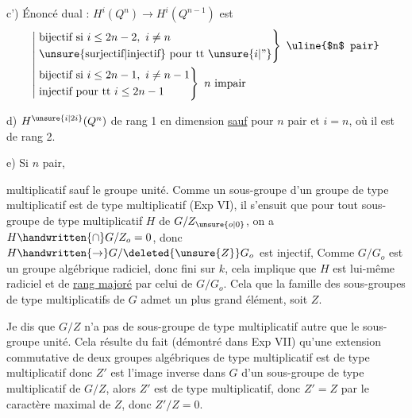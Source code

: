 c') Énoncé dual : $H^i(Q^n)\longrightarrow H^i(Q^{n-1})$ est
\[
\left|\begin{aligned}
&\left.\begin{aligned}
&\text{bijectif si }i\leq 2n-2,\ i\ne n\\
&\text{\unsure{surjectif|injectif} pour tt } \unsure{i|\text{''}}
\end{aligned}\right\}\ \text{\uline{$n$ pair}}\\
&\left.\begin{aligned}
&\text{bijectif si }i\leq2n-1,\ i\ne n-1\\
&\text{injectif pour tt }i\leq2n-1
\end{aligned}\right\}\ n\text{ impair}
\end{aligned}\right.
\]

d) $H^{\unsure{i|2i}}(Q^n)$   de rang 1 en  dimension  \uline{sauf} pour $n$ pair et  $i=n$, où il est de rang 2.

e) Si $n$ pair,

multiplicatif  sauf le groupe unité. Comme un sous-groupe d'un \margin{$\bullet$} groupe de type multiplicatif est de type multiplicatif (Exp VI\quad ), il s'ensuit que  pour tout sous-groupe de type multiplicatif $H$ de $G/Z_{\unsure{o|0}}$, on a $H\handwritten{\cap}G/Z_o=0$, donc $H\handwritten{\to}G/\deleted{\unsure{Z}}G_o$ est injectif, Comme $G/G_o$ est un groupe algébrique radiciel, donc fini sur $k$, cela implique que $H$ est lui-même radiciel et de \uline{rang majoré} par celui de $G/G_o$. Cela  que la famille des sous-groupes de type multiplicatifs de $G$ admet un plus grand élément, soit $Z$.

Je dis que $G/Z$ n'a pas de sous-groupe de type multiplicatif autre que le sous-groupe unité. Cela résulte du fait (démontré dans \margin{$\bullet$} Exp VII\quad ) qu'une extension commutative de deux groupes algébriques de type multiplicatif est de type multiplicatif\handwritten{;}   donc $Z'$ est l'image inverse dans $G$ d'un sous-groupe de type multiplicatif de $G/Z$, alors $Z'$ est de type multiplicatif, donc $Z'=Z$ par le caractère maximal de $Z$, donc $Z'/Z=0$.

